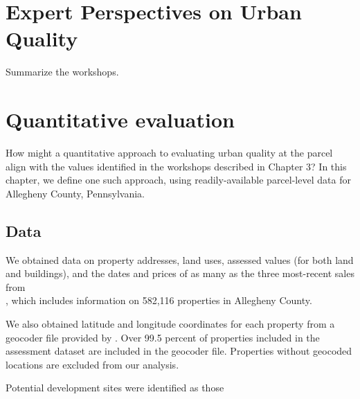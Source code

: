 \documentclass[
]{book}
\begin{document}
\hypertarget{expert-perspectives-on-urban-quality}{%
\chapter{Expert Perspectives on Urban Quality}\label{expert-perspectives-on-urban-quality}}

Summarize the workshops.

\hypertarget{quantitative-evaluation}{%
\chapter{Quantitative evaluation}\label{quantitative-evaluation}}

How might a quantitative approach to evaluating urban quality at the parcel
align with the values identified in the workshops described in Chapter 3? In
this chapter, we define one such approach, using readily-available parcel-level
data for Allegheny County, Pennsylvania.

\hypertarget{data}{%
\section{Data}\label{data}}

We obtained data on property addresses, land uses, assessed values (for both
land and buildings), and the dates and prices of as many as the three
most-recent sales from\\
\citet{allegheny_county_office_of_property_assessments_allegheny_2022}, which
includes information on 582,116 properties in Allegheny County.

We also obtained latitude and longitude coordinates for each property from a
geocoder file provided by \citet{western_pennsylvania_regional_data_center_geocoders_2021}.
Over 99.5 percent of properties included in the assessment dataset are included
in the geocoder file. Properties without geocoded locations are excluded from
our analysis.

Potential development sites were identified as those
\end{document}
